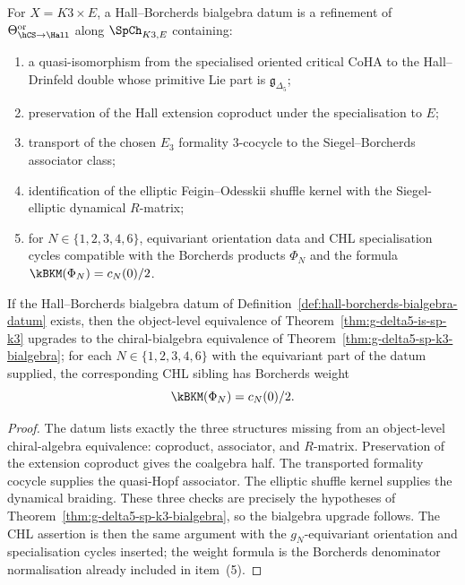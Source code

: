 \begin{definition}
\label{def:hall-borcherds-bialgebra-datum}
For $X=K3\times E$, a Hall--Borcherds bialgebra datum is a refinement
of $\Theta_{\hCS\to\Hall}^{\mathrm{or}}$ along
$\SpCh_{K3,E}$ containing:
\begin{enumerate}
\item a quasi-isomorphism from the specialised oriented critical CoHA
to the Hall--Drinfeld double whose primitive Lie part is
$\mathfrak g_{\Delta_5}$;
\item preservation of the Hall extension coproduct under the
specialisation to $E$;
\item transport of the chosen $E_3$ formality $3$-cocycle to the
Siegel--Borcherds associator class;
\item identification of the elliptic Feigin--Odesskii shuffle kernel
with the Siegel-elliptic dynamical $R$-matrix;
\item for $N\in\{1,2,3,4,6\}$, equivariant orientation data and CHL
specialisation cycles compatible with the Borcherds products
$\Phi_N$ and the formula $\kBKM(\Phi_N)=c_N(0)/2$.
\end{enumerate}
\end{definition}

\begin{corollary}
\label{cor:bialgebra-chl-consequence-of-datum}
If the Hall--Borcherds bialgebra datum of
Definition~\ref{def:hall-borcherds-bialgebra-datum} exists, then the
object-level equivalence of Theorem~\ref{thm:g-delta5-is-sp-k3}
upgrades to the chiral-bialgebra equivalence of
Theorem~\ref{thm:g-delta5-sp-k3-bialgebra}; for each
$N\in\{1,2,3,4,6\}$ with the equivariant part of the datum supplied, the
corresponding CHL sibling has Borcherds weight
\[
 \kBKM(\Phi_N)=c_N(0)/2 .
\]
\end{corollary}

\begin{proof}
The datum lists exactly the three structures missing from an
object-level chiral-algebra equivalence: coproduct, associator, and
$R$-matrix. Preservation of the extension coproduct gives the
coalgebra half. The transported formality cocycle supplies the
quasi-Hopf associator. The elliptic shuffle kernel supplies the
dynamical braiding. These three checks are precisely the hypotheses of
Theorem~\ref{thm:g-delta5-sp-k3-bialgebra}, so the bialgebra upgrade
follows. The CHL assertion is then the same argument with the
$g_N$-equivariant orientation and specialisation cycles inserted; the
weight formula is the Borcherds denominator normalisation already
included in item~(5).
\end{proof}

